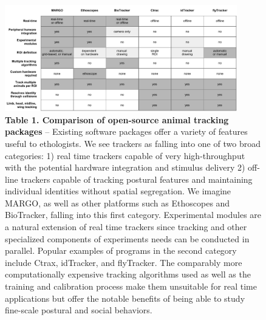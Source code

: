\documentclass[10pt]{article}
\begin{document}
\newpage
\begin{figure}[t!]
	\begin{center}
		\vspace*{-8cm}
		\includegraphics[width=0.9\textwidth]{../figures/platform_comparison_table.pdf}
	\end{center}
	\caption*{\footnotesize \textbf{Table 1. Comparison of open-source animal tracking packages} -- Existing software packages offer a variety of features useful to ethologists. We see trackers as falling into one of two broad categories: 1) real time trackers capable of very high-throughput with the potential hardware integration and stimulus delivery 2) off-line trackers capable of tracking postural features and maintaining individual identities without spatial segregation. We imagine MARGO, as well as other platforms such as Ethoscopes and BioTracker, falling into this first category. Experimental modules are a natural extension of real time trackers since tracking and other specialized components of experiments needs can be conducted in parallel. Popular examples of programs in the second category include Ctrax, idTracker, and flyTracker. The comparably more computationally expensive tracking algorithms used as well as the training and calibration process make them unsuitable for real time applications but offer the notable benefits of being able to study fine-scale postural and social behaviors.}
\end{figure}
\end{document}
